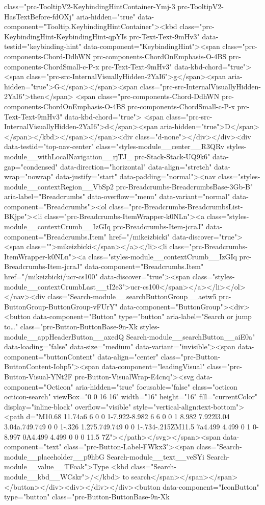 class="prc-TooltipV2-KeybindingHintContainer-Ymj-3 prc-TooltipV2-HasTextBefore-fdOXj" aria-hidden="true" data-component="Tooltip.KeybindingHintContainer"><kbd class="prc-KeybindingHint-KeybindingHint-qpYIs prc-Text-Text-9mHv3" data-testid="keybinding-hint" data-component="KeybindingHint"><span class="prc-components-Chord-DdhWN prc-components-ChordOnEmphasis-O-4BS prc-components-ChordSmall-c-P-x prc-Text-Text-9mHv3" data-kbd-chord="true"> <span class="prc-src-InternalVisuallyHidden-2YaI6">g</span><span aria-hidden="true">G</span></span><span class="prc-src-InternalVisuallyHidden-2YaI6">then</span> <span class="prc-components-Chord-DdhWN prc-components-ChordOnEmphasis-O-4BS prc-components-ChordSmall-c-P-x prc-Text-Text-9mHv3" data-kbd-chord="true"> <span class="prc-src-InternalVisuallyHidden-2YaI6">d</span><span aria-hidden="true">D</span></span></kbd></span></span><div class="d-none"></div></div><div data-testid="top-nav-center" class="styles-module__center__R3QRv styles-module__withLocalNavigation__rjTJ_ prc-Stack-Stack-UQ9k6" data-gap="condensed" data-direction="horizontal" data-align="stretch" data-wrap="nowrap" data-justify="start" data-padding="normal"><nav class="styles-module__contextRegion__VbSp2 prc-Breadcrumbs-BreadcrumbsBase-3Gb-B" aria-label="Breadcrumbs" data-overflow="menu" data-variant="normal" data-component="Breadcrumbs"><ol class="prc-Breadcrumbs-BreadcrumbsList-BKjpe"><li class="prc-Breadcrumbs-ItemWrapper-k0NLn"><a class="styles-module__contextCrumb__IzGIq prc-Breadcrumbs-Item-jcraJ" data-component="Breadcrumbs.Item" href="/mikeizbicki" data-discover="true"><span class="">mikeizbicki</span></a></li><li class="prc-Breadcrumbs-ItemWrapper-k0NLn"><a class="styles-module__contextCrumb__IzGIq prc-Breadcrumbs-Item-jcraJ" data-component="Breadcrumbs.Item" href="/mikeizbicki/ucr-cs100" data-discover="true"><span class="styles-module__contextCrumbLast__tI2e3">ucr-cs100</span></a></li></ol></nav><div class="Search-module__searchButtonGroup__aetw5 prc-ButtonGroup-ButtonGroup-vFUrY" data-component="ButtonGroup"><div><button data-component="Button" type="button" aria-label="Search or jump to…" class="prc-Button-ButtonBase-9n-Xk styles-module__appHeaderButton__axedQ Search-module__searchButton__aiE0a" data-loading="false" data-size="medium" data-variant="invisible"><span data-component="buttonContent" data-align="center" class="prc-Button-ButtonContent-Iohp5"><span data-component="leadingVisual" class="prc-Button-Visual-YNt2F prc-Button-VisualWrap-E4cnq"><svg data-component="Octicon" aria-hidden="true" focusable="false" class="octicon octicon-search" viewBox="0 0 16 16" width="16" height="16" fill="currentColor" display="inline-block" overflow="visible" style="vertical-align:text-bottom"><path d="M10.68 11.74a6 6 0 0 1-7.922-8.982 6 6 0 0 1 8.982 7.922l3.04 3.04a.749.749 0 0 1-.326 1.275.749.749 0 0 1-.734-.215ZM11.5 7a4.499 4.499 0 1 0-8.997 0A4.499 4.499 0 0 0 11.5 7Z"></path></svg></span><span data-component="text" class="prc-Button-Label-FWkx3"><span class="Search-module__placeholder__p9hbG Search-module__text__veSYi Search-module__value__TFoak">Type <kbd class="Search-module__kbd__WCskr">/</kbd> to search</span></span></span></button></div><div></div></div><button data-component="IconButton" type="button" class="prc-Button-ButtonBase-9n-Xk 